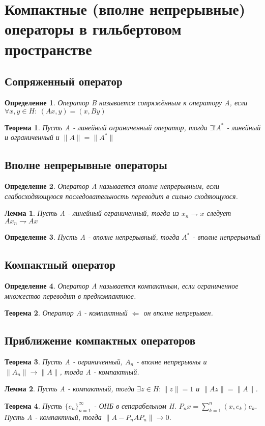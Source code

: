 \documentclass[9pt, a4paper]{extarticle}
\newtheorem{theorem}{Теорема}
\newtheorem{lemma}{Лемма}
\newtheorem{definition}{Определение}
\numberwithin{equation}{section}
\numberwithin{lemma}{section}
\numberwithin{definition}{section}
\numberwithin{notabene}{section}
\numberwithin{corollary}{section}
\begin{document}
\section{Компактные (вполне непрерывные) операторы в гильбертовом пространстве}
\subsection{Сопряженный оператор}
	\begin{definition}
		Оператор B называется сопряжённым к оператору A, если $\forall x, y \in H: \ (Ax, y) = (x, By)$
	\end{definition}
	\begin{theorem}
		Пусть A - линейный ограниченный оператор, тогда $\exists! A^*$ - линейный и ограниченный и $\|A\| = \|A^*\|$
	\end{theorem}
\subsection{Вполне непрерывные операторы}
	\begin{definition}
		Оператор A называется вполне непрерывным, если слабосходяющуюся последовательность переводит в сильно сходяющуюся.
	\end{definition}
	\begin{lemma}
		Пусть A - линейный ограниченный, тогда из $x_n \rightharpoondown x$ следует $Ax_n  \rightharpoondown  Ax$
	\end{lemma}
	\begin{definition}
		Пусть A - вполне непрерывный, тогда $A^*$ - вполне непрерывный
	\end{definition}
\subsection{Компактный оператор}
	\begin{definition}
		Оператор A называется компактным, если ограниченное множество переводит в предкомпактное.
	\end{definition}
	\begin{theorem}
		Оператор A - компактный $\Leftarrow$ он вполне непрерывен. 
	\end{theorem}
\subsection{Приближение компактных операторов}
	\begin{theorem}
		Пусть A - ограниченный, $A_n$ - вполне непрерывны и $\|A_n\| \to \|A\|$, тогда A - компактный. 	
	\end{theorem}
	\begin{lemma}
		Пусть A - компактный, тогда $\exists z \in H: \|z\| = 1$ и $\|Az\| = \|A\|$.
	\end{lemma}
	\begin{theorem}
		Пусть $\{e_n\}_{n=1}^\infty$ - ОНБ в сепарабельном H. $P_nx  = \sum\limits_{k=1}^{n} (x,e_k) e_k$. Пусть A - компактный, тогда $\|A - P_nAP_n\| \to 0$.
	\end{theorem}
\end{document}
